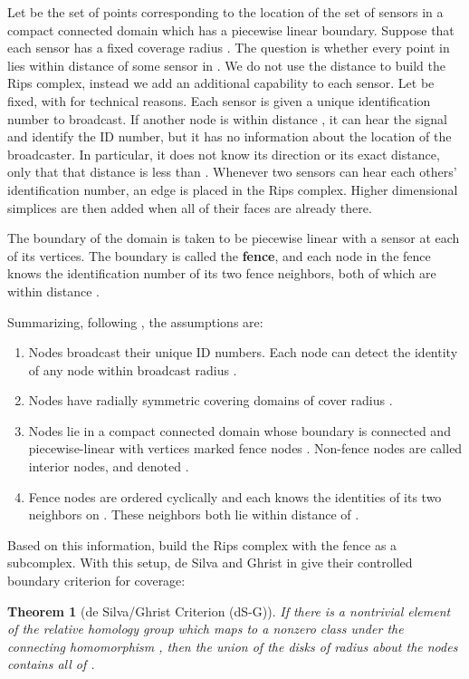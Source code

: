 \documentclass[10pt,twocolumn]{article} \usepackage{amsmath,epsf,amssymb,cite,pifont,amsthm, mathrsfs,epsfig,  bbm, amsthm,  setspace}
\newtheorem{thm}{Theorem}
\renewcommand{\1}{\mathbbm{1}}
\begin{document}
Let    be the set of points corresponding to the location of the set of sensors in a compact connected domain 
which has a piecewise linear boundary.
Suppose that each sensor has a fixed coverage radius .
The question is whether every point in  lies within distance  of some sensor in .
We do not use the distance  to build the Rips complex, instead we add an additional capability to each sensor.
Let  be fixed, with  for technical reasons.
Each sensor is given a unique identification number to broadcast.
If another node is within distance , it can hear the signal and identify the ID
number, but it has no information about the location of the broadcaster.
In particular, it does not know its direction or its exact distance,  only that that distance
is less than .
Whenever two sensors can hear each others' identification number, an edge is
placed in the Rips complex.
Higher dimensional simplices are then added when all of their faces are already there.

The boundary of the domain  is taken to be
piecewise linear with a sensor at each of its vertices.
The boundary is called the
 \textbf{fence}, and
each  node in the fence knows the identification number of its two
fence neighbors, both of which are  within distance .

Summarizing, following \cite{DeSilva2006},
 the assumptions are:
\begin{enumerate}
	\item Nodes  broadcast their unique ID numbers.
	          Each node can detect the identity of any node within broadcast radius .
	\item Nodes have radially symmetric covering domains of cover radius .
	\item Nodes lie in a compact connected domain  whose boundary
	          is connected and piecewise-linear with vertices marked fence
	         nodes .
		  Non-fence nodes are called interior nodes,  and denoted .
	\item Fence nodes  are ordered cyclically and each  knows the
	        identities of its two neighbors on .
	        These neighbors both lie within distance  of .
\end{enumerate}
Based on this information, build the Rips complex  with the fence  as a subcomplex.
With this setup, de Silva and Ghrist in \cite{DeSilva2006}
give their controlled boundary criterion for coverage:
\begin{thm}[de Silva/Ghrist Criterion (dS-G)] \label{Criterion}
   If there is a nontrivial element of the relative homology group
    which maps to a nonzero class under the
   connecting homomorphism ,
   then the union of the disks of radius  about the nodes contains all of .
\end{thm}
\end{document}
